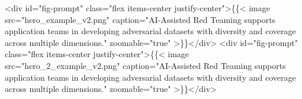 <div id="fig-prompt" class="flex items-center justify-center">\{\{< image src="hero_example_v2.png" caption="AI-Assisted Red Teaming supports application teams in developing adversarial datasets with diversity and coverage across multiple dimensions." zoomable="true" >\}\}</div>
<div id="fig-prompt" class="flex items-center justify-center">\{\{< image src="hero_2_example_v2.png" caption="AI-Assisted Red Teaming supports application teams in developing adversarial datasets with diversity and coverage across multiple dimensions." zoomable="true" >\}\}</div>